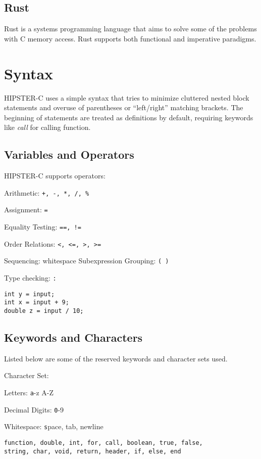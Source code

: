 \documentclass{article}
\begin{document}
\subsection{Rust}
Rust is a systems programming language that aims to solve some of the problems with C memory access. Rust supports both functional and imperative paradigms.




\section{Syntax}
HIPSTER-C uses a simple syntax that tries to minimize cluttered nested block statements and overuse of parentheses or ``left/right'' matching brackets. The beginning of statements are treated as definitions by default, requiring keywords like \textit{call} for calling function.  


\subsection{Variables and Operators}
HIPSTER-C supports operators:\par
Arithmetic: \texttt{+, -, *, /, \%}\par 
Assignment: \texttt{=}\par
Equality Testing: \texttt{==, !=}\par
Order Relations: \texttt{<, <=, >, >=}\par
Sequencing: whitespace
Subexpression Grouping: \texttt{( )}\par
Type checking: \texttt{:}

\begin{verbatim}
int y = input;
int x = input + 9;
double z = input / 10;
\end{verbatim}

\subsection {Keywords and Characters}
Listed below are some of the reserved keywords and character sets used.

Character Set:\par
Letters: \texttt a-z A-Z\par
Decimal Digits: \texttt 0-9\par
Whitespace: \texttt space, tab, newline\par

\begin{verbatim}function, double, int, for, call, boolean, true, false,
string, char, void, return, header, if, else, end
\end{verbatim}\par
\end{document}
